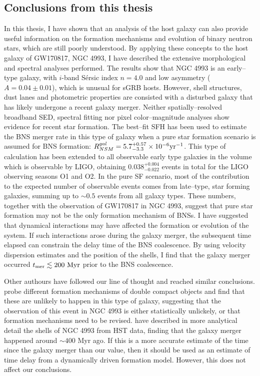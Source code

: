 \subsection{Conclusions from this thesis}
In this thesis, I have shown that an analysis of the host galaxy can also provide useful information on the formation mechanisms and evolution of binary neutron stars, which are still poorly understood. By applying these concepts to the host galaxy of GW170817, NGC 4993, I have described the extensive morphological and spectral analyses performed. The results show that NGC 4993 is an early--type galaxy, with $i$-band S\'ersic index $n=4.0$ and low asymmetry ($A=0.04\pm 0.01$), which is unusual for sGRB hosts. However, shell structures, dust lanes and photometric properties are consisted with a disturbed galaxy that has likely undergone a recent galaxy merger. Neither spatially--resolved broadband SED, spectral fitting nor pixel color--magnitude analyses show evidence for recent star formation. The best--fit SFH has been used to estimate the BNS merger rate in this type of galaxy when a pure star formation scenario is assumed for BNS formation: $R_{NSM}^{gal}= 5.7^{+0.57}_{-3.3} \times 10^{-6} {\rm yr}^{-1}$. This type of calculation has been extended to all observable early type galaxies in the volume which is observable by LIGO, obtaining $0.038^{+0.004}_{-0.022}$ events in total for the LIGO observing seasons O1 and O2. In the pure SF scenario, most of the contribution to the expected number of observable events comes from late--type, star forming galaxies, summing up to $\sim 0.5$ events from all galaxy types. These numbers, together with the observation of GW170817 in NGC 4993, suggest that pure star formation may not be the only formation mechanism of BNSs. I have suggested that dynamical interactions may have affected the formation or evolution of the system. If such interactions arose during the galaxy merger, the subsequent time elapsed can constrain the delay time of the BNS coalescence. By using velocity dispersion estimates and the position of the shells, I find that the galaxy merger occurred $t_{\rm mer}\lesssim 200~{\rm Myr}$ prior to the BNS coalescence. 

Other authours have followed our line of thought and reached similar conclusions. \citealt{Belczynski} probe different formation mechanisms of double compact objects and find that these are unlikely to happen in this type of galaxy, suggesting that the observation of this event in NGC 4993 is either statistically unlickely, or that formation mechanisms need to be revised. \citealt{ebrova} have described in more analytical detail the shells of NGC 4993 from HST data, finding that the galaxy merger happened around $\sim 400$ Myr ago. If this is a more accurate estimate of the time since the galaxy merger than our value, then it should be used as an estimate of time delay from a dynamically driven formation model. However, this does not affect our conclusions.

